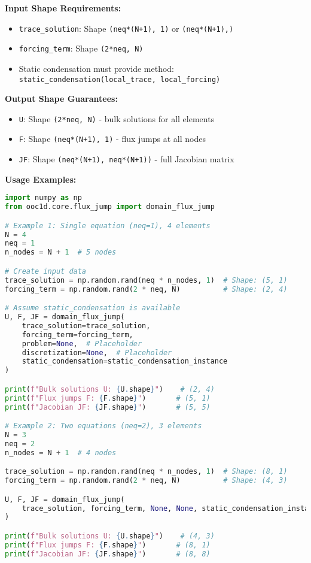 \textbf{Input Shape Requirements:}
\begin{itemize}
    \item \texttt{trace\_solution}: Shape \texttt{(neq*(N+1), 1)} or \texttt{(neq*(N+1),)}
    \item \texttt{forcing\_term}: Shape \texttt{(2*neq, N)}
    \item Static condensation must provide method: \texttt{static\_condensation(local\_trace, local\_forcing)}
\end{itemize}

\textbf{Output Shape Guarantees:}
\begin{itemize}
    \item \texttt{U}: Shape \texttt{(2*neq, N)} - bulk solutions for all elements
    \item \texttt{F}: Shape \texttt{(neq*(N+1), 1)} - flux jumps at all nodes
    \item \texttt{JF}: Shape \texttt{(neq*(N+1), neq*(N+1))} - full Jacobian matrix
\end{itemize}

\textbf{Usage Examples:}
\begin{lstlisting}[language=Python, caption=Domain Flux Jump Usage Examples]
import numpy as np
from ooc1d.core.flux_jump import domain_flux_jump

# Example 1: Single equation (neq=1), 4 elements
N = 4
neq = 1
n_nodes = N + 1  # 5 nodes

# Create input data
trace_solution = np.random.rand(neq * n_nodes, 1)  # Shape: (5, 1)
forcing_term = np.random.rand(2 * neq, N)          # Shape: (2, 4)

# Assume static_condensation is available
U, F, JF = domain_flux_jump(
    trace_solution=trace_solution,
    forcing_term=forcing_term,
    problem=None,  # Placeholder
    discretization=None,  # Placeholder
    static_condensation=static_condensation_instance
)

print(f"Bulk solutions U: {U.shape}")    # (2, 4)
print(f"Flux jumps F: {F.shape}")       # (5, 1)
print(f"Jacobian JF: {JF.shape}")       # (5, 5)

# Example 2: Two equations (neq=2), 3 elements
N = 3
neq = 2
n_nodes = N + 1  # 4 nodes

trace_solution = np.random.rand(neq * n_nodes, 1)  # Shape: (8, 1)
forcing_term = np.random.rand(2 * neq, N)          # Shape: (4, 3)

U, F, JF = domain_flux_jump(
    trace_solution, forcing_term, None, None, static_condensation_instance
)

print(f"Bulk solutions U: {U.shape}")    # (4, 3)
print(f"Flux jumps F: {F.shape}")       # (8, 1)  
print(f"Jacobian JF: {JF.shape}")       # (8, 8)
\end{lstlisting}

